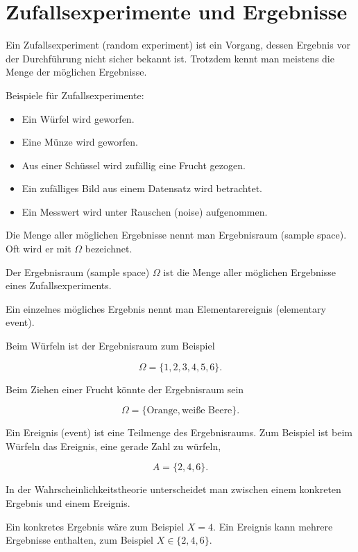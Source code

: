 \section{Zufallsexperimente und Ergebnisse}

Ein Zufallsexperiment (random experiment) ist ein Vorgang, dessen Ergebnis vor der Durchführung nicht sicher bekannt ist.
Trotzdem kennt man meistens die Menge der möglichen Ergebnisse.

\begin{examplebox}
Beispiele für Zufallsexperimente:

\begin{itemize}
    \item Ein Würfel wird geworfen.
    \item Eine Münze wird geworfen.
    \item Aus einer Schüssel wird zufällig eine Frucht gezogen.
    \item Ein zufälliges Bild aus einem Datensatz wird betrachtet.
    \item Ein Messwert wird unter Rauschen (noise) aufgenommen.
\end{itemize}
\end{examplebox}

Die Menge aller möglichen Ergebnisse nennt man Ergebnisraum (sample space).
Oft wird er mit \(\Omega\) bezeichnet.

\begin{definitionbox}
Der Ergebnisraum (sample space) \(\Omega\) ist die Menge aller möglichen Ergebnisse eines Zufallsexperiments.

Ein einzelnes mögliches Ergebnis nennt man Elementarereignis (elementary event).
\end{definitionbox}

Beim Würfeln ist der Ergebnisraum zum Beispiel

\[
    \Omega = \{1,2,3,4,5,6\}.
\]

Beim Ziehen einer Frucht könnte der Ergebnisraum sein

\[
    \Omega = \{\text{Orange},\text{weiße Beere}\}.
\]

Ein Ereignis (event) ist eine Teilmenge des Ergebnisraums.
Zum Beispiel ist beim Würfeln das Ereignis, eine gerade Zahl zu würfeln,

\[
    A = \{2,4,6\}.
\]

\begin{notebox}
In der Wahrscheinlichkeitstheorie unterscheidet man zwischen einem konkreten Ergebnis und einem Ereignis.

Ein konkretes Ergebnis wäre zum Beispiel \(X=4\).
Ein Ereignis kann mehrere Ergebnisse enthalten, zum Beispiel \(X \in \{2,4,6\}\).
\end{notebox}

